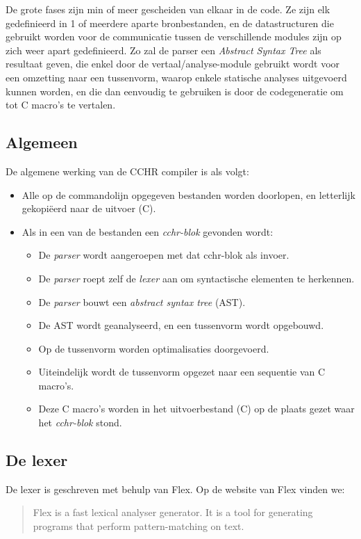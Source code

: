 De grote fases zijn min of meer gescheiden van elkaar in de code. Ze zijn elk gedefinieerd in 1 of meerdere aparte bronbestanden, en de datastructuren die gebruikt worden voor de communicatie tussen de verschillende modules zijn op zich weer apart gedefinieerd. Zo zal de parser een {\em Abstract Syntax Tree} als resultaat geven, die enkel door de vertaal/analyse-module gebruikt wordt voor een omzetting naar een tussenvorm, waarop enkele statische analyses uitgevoerd kunnen worden, en die dan eenvoudig te gebruiken is door de codegeneratie om tot C macro's te vertalen.

\subsection{Algemeen}

De algemene werking van de CCHR compiler is als volgt: \begin{itemize}
  \item Alle op de commandolijn opgegeven bestanden worden doorlopen, en letterlijk gekopi\"eerd naar de uitvoer (C).
  \item Als in een van de bestanden een {\em cchr-blok} gevonden wordt: \begin{itemize}
    \item De {\em parser} wordt aangeroepen met dat cchr-blok als invoer.
    \item De {\em parser} roept zelf de {\em lexer} aan om syntactische elementen te herkennen.
    \item De {\em parser} bouwt een {\em abstract syntax tree} (AST).
    \item De AST wordt geanalyseerd, en een tussenvorm wordt opgebouwd.
    \item Op de tussenvorm worden optimalisaties doorgevoerd.
    \item Uiteindelijk wordt de tussenvorm opgezet naar een sequentie van C macro's.
    \item Deze C macro's worden in het uitvoerbestand (C) op de plaats gezet waar het {\em cchr-blok} stond.
  \end{itemize}
\end{itemize}

\subsection{De lexer}

De lexer is geschreven met behulp van Flex. Op de website van Flex vinden we: \begin{quote}
  Flex is a fast lexical analyser generator. It is a tool for generating programs that perform pattern-matching on text.
\end{quote}

